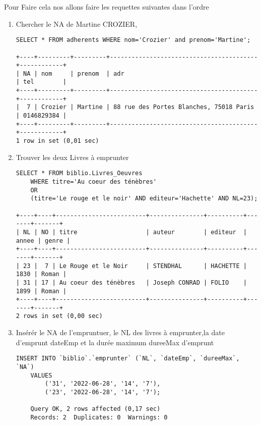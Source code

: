 \documentclass[11]{article}
\begin{document}
Pour Faire cela nos allons faire les requettes suivantes dans l'ordre
\begin{enumerate}

	\item  Chercher le NA de Martine CROZIER,

	      \begin{verbatim}
SELECT * FROM adherents WHERE nom='Crozier' and prenom='Martine';

+----+---------+---------+-----------------------------------------+------------+
| NA | nom     | prenom  | adr                                     | tel        |
+----+---------+---------+-----------------------------------------+------------+
|  7 | Crozier | Martine | 88 rue des Portes Blanches, 75018 Paris | 0146829384 |
+----+---------+---------+-----------------------------------------+------------+
1 row in set (0,01 sec)
\end{verbatim}
	\item Trouver les deux Livres à emprunter
	      \begin{verbatim}
SELECT * FROM biblio.Livres_Oeuvres
	WHERE titre='Au coeur des ténèbres' 
	OR 
	(titre='Le rouge et le noir' AND editeur='Hachette' AND NL=23);
	
+----+----+-------------------------+---------------+----------+-------+-------+
| NL | NO | titre                   | auteur        | editeur  | annee | genre |
+----+----+-------------------------+---------------+----------+-------+-------+
| 23 |  7 | Le Rouge et le Noir     | STENDHAL      | HACHETTE |  1830 | Roman |
| 31 | 17 | Au coeur des ténèbres   | Joseph CONRAD | FOLIO    |  1899 | Roman |
+----+----+-------------------------+---------------+----------+-------+-------+
2 rows in set (0,00 sec)
\end{verbatim}
	\item Insérér le NA de l'empruntuer, le NL des livres à emprunter,la date d'emprunt dateEmp et la durée maximum dureeMax d'emprunt
	      \begin{verbatim}
INSERT INTO `biblio`.`emprunter` (`NL`, `dateEmp`, `dureeMax`, `NA`) 
	VALUES 
		('31', '2022-06-28', '14', '7'),
		('23', '2022-06-28', '14', '7');

	Query OK, 2 rows affected (0,17 sec)
	Records: 2  Duplicates: 0  Warnings: 0
\end{verbatim}
\end{enumerate}
\end{document}
